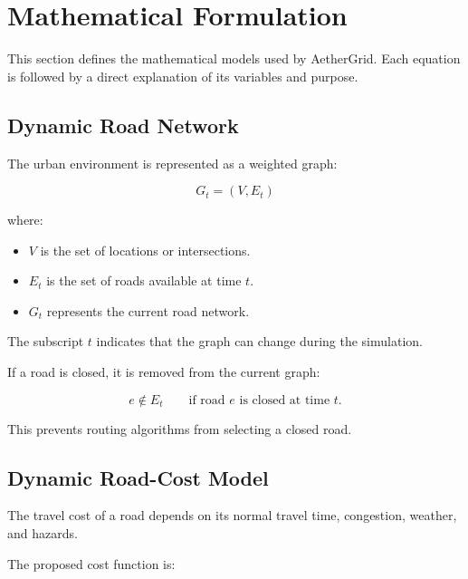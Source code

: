 \documentclass[12pt,a4paper]{article}
\begin{document}
\section{Mathematical Formulation}

This section defines the mathematical models used by AetherGrid.
Each equation is followed by a direct explanation of its variables
and purpose.





\subsection{Dynamic Road Network}

The urban environment is represented as a weighted graph:

\begin{equation}
    G_t = (V,E_t)
    \label{eq:graph}
\end{equation}

where:

\begin{itemize}
    \item $V$ is the set of locations or intersections.
    \item $E_t$ is the set of roads available at time $t$.
    \item $G_t$ represents the current road network.
\end{itemize}

The subscript $t$ indicates that the graph can change during the
simulation.

If a road is closed, it is removed from the current graph:

\begin{equation}
    e \notin E_t
    \qquad
    \text{if road } e \text{ is closed at time } t.
    \label{eq:closedroad}
\end{equation}

This prevents routing algorithms from selecting a closed road.





\subsection{Dynamic Road-Cost Model}

The travel cost of a road depends on its normal travel time,
congestion, weather, and hazards.

The proposed cost function is:
\end{document}
